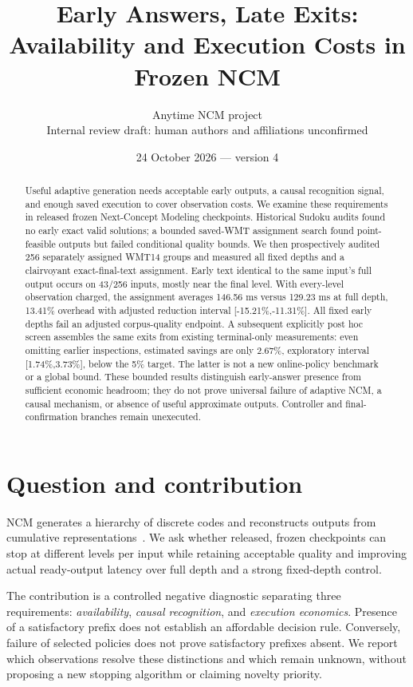 \documentclass[11pt]{article}
\title{Early Answers, Late Exits:\\Availability and Execution Costs in Frozen NCM}
\author{Anytime NCM project\\{\small Internal review draft: human authors and affiliations unconfirmed}}
\date{24 October 2026 --- version 4}
\begin{document}
\maketitle
\begin{abstract}
Useful adaptive generation needs acceptable early outputs, a causal recognition signal, and enough saved execution to cover observation costs. We examine these requirements in released frozen Next-Concept Modeling checkpoints. Historical Sudoku audits found no early exact valid solutions; a bounded saved-WMT assignment search found point-feasible outputs but failed conditional quality bounds. We then prospectively audited 256 separately assigned WMT14 groups and measured all fixed depths and a clairvoyant exact-final-text assignment. Early text identical to the same input's full output occurs on 43/256 inputs, mostly near the final level. With every-level observation charged, the assignment averages 146.56 ms versus 129.23 ms at full depth, 13.41\% overhead with adjusted reduction interval [-15.21\%,-11.31\%]. All fixed early depths fail an adjusted corpus-quality endpoint. A subsequent explicitly post hoc screen assembles the same exits from existing terminal-only measurements: even omitting earlier inspections, estimated savings are only 2.67\%, exploratory interval [1.74\%,3.73\%], below the 5\% target. The latter is not a new online-policy benchmark or a global bound. These bounded results distinguish early-answer presence from sufficient economic headroom; they do not prove universal failure of adaptive NCM, a causal mechanism, or absence of useful approximate outputs. Controller and final-confirmation branches remain unexecuted.
\end{abstract}

\section{Question and contribution}
NCM generates a hierarchy of discrete codes and reconstructs outputs from cumulative representations~\cite{ncm}. We ask whether released, frozen checkpoints can stop at different levels per input while retaining acceptable quality and improving actual ready-output latency over full depth and a strong fixed-depth control.

The contribution is a controlled negative diagnostic separating three requirements: \emph{availability}, \emph{causal recognition}, and \emph{execution economics}. Presence of a satisfactory prefix does not establish an affordable decision rule. Conversely, failure of selected policies does not prove satisfactory prefixes absent. We report which observations resolve these distinctions and which remain unknown, without proposing a new stopping algorithm or claiming novelty priority.
\end{document}
